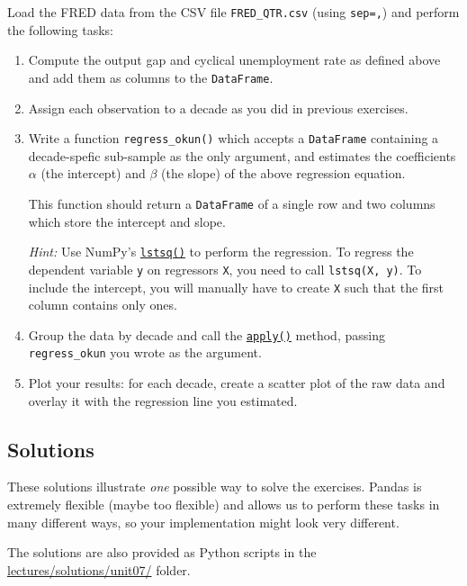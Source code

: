 \documentclass{scrartcl}
\begin{document}
Load the FRED data from the CSV file \texttt{FRED\_QTR.csv} (using
\texttt{sep=\textquotesingle{},\textquotesingle{}}) and perform the
following tasks:

\begin{enumerate}
\def\labelenumi{\arabic{enumi}.}
\item
  Compute the output gap and cyclical unemployment rate as defined above
  and add them as columns to the \texttt{DataFrame}.
\item
  Assign each observation to a decade as you did in previous exercises.
\item
  Write a function \texttt{regress\_okun()} which accepts a
  \texttt{DataFrame} containing a decade-spefic sub-sample as the only
  argument, and estimates the coefficients \(\alpha\) (the intercept)
  and \(\beta\) (the slope) of the above regression equation.

  This function should return a \texttt{DataFrame} of a single row and
  two columns which store the intercept and slope.

  \emph{Hint:} Use NumPy's
  \href{https://numpy.org/doc/stable/reference/generated/numpy.linalg.lstsq.html}{\texttt{lstsq()}}
  to perform the regression. To regress the dependent variable
  \texttt{y} on regressors \texttt{X}, you need to call
  \texttt{lstsq(X,\ y)}. To include the intercept, you will manually
  have to create \texttt{X} such that the first column contains only
  ones.
\item
  Group the data by decade and call the
  \href{https://pandas.pydata.org/pandas-docs/stable/reference/api/pandas.core.groupby.GroupBy.apply.html}{\texttt{apply()}}
  method, passing \texttt{regress\_okun} you wrote as the argument.
\item
  Plot your results: for each decade, create a scatter plot of the raw
  data and overlay it with the regression line you estimated.
\end{enumerate}


\hypertarget{solutions}{%
\subsection{Solutions}\label{solutions}}

These solutions illustrate \emph{one} possible way to solve the
exercises. Pandas is extremely flexible (maybe too flexible) and allows
us to perform these tasks in many different ways, so your implementation
might look very different.

The solutions are also provided as Python scripts in the
\href{../lectures/solutions/unit07}{lectures/solutions/unit07/} folder.
\end{document}
